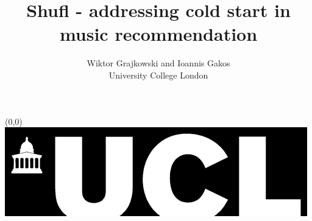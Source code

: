 \documentclass[a0]{a0poster}
\title{Shufl - addressing cold start in music recommendation}
\author{Wiktor Grajkowski and Ioannis Gakos\\ University College London}
\begin{document}
  \begin{textblock}{23}(0,0)
  \vspace*{-48mm}\hspace*{-42mm}%
  \includegraphics{ucl_bar_black.eps}
  \begin{minipage}{1191mm}		%
  \vspace{-20cm}
  \maketitle
  \end{minipage}
  \end{textblock}

\end{document}
